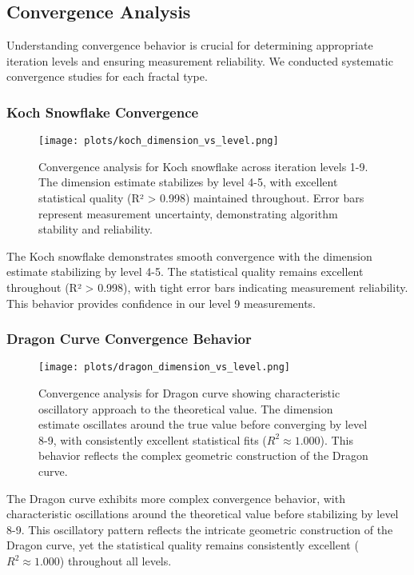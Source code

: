 \documentclass[preprint,12pt]{elsarticle}
\begin{document}
\subsection{Convergence Analysis}

Understanding convergence behavior is crucial for determining appropriate iteration levels and ensuring measurement reliability. We conducted systematic convergence studies for each fractal type.

\subsubsection{Koch Snowflake Convergence}

\begin{figure}[ht]
\centering
\texttt{[image: plots/koch\_dimension\_vs\_level.png]}
\caption{Convergence analysis for Koch snowflake across iteration levels 1-9. The dimension estimate stabilizes by level 4-5, with excellent statistical quality (R² > 0.998) maintained throughout. Error bars represent measurement uncertainty, demonstrating algorithm stability and reliability.}
\label{fig:koch_convergence}
\end{figure}

The Koch snowflake demonstrates smooth convergence with the dimension estimate stabilizing by level 4-5. The statistical quality remains excellent throughout (R² > 0.998), with tight error bars indicating measurement reliability. This behavior provides confidence in our level 9 measurements.

\subsubsection{Dragon Curve Convergence Behavior}

\begin{figure}[ht]
\centering
\texttt{[image: plots/dragon\_dimension\_vs\_level.png]}
\caption{Convergence analysis for Dragon curve showing characteristic oscillatory approach to the theoretical value. The dimension estimate oscillates around the true value before converging by level 8-9, with consistently excellent statistical fits ($R^2 \approx 1.000$). This behavior reflects the complex geometric construction of the Dragon curve.}
\label{fig:dragon_convergence}
\end{figure}

The Dragon curve exhibits more complex convergence behavior, with characteristic oscillations around the theoretical value before stabilizing by level 8-9. This oscillatory pattern reflects the intricate geometric construction of the Dragon curve, yet the statistical quality remains consistently excellent ($R^2 \approx 1.000$) throughout all levels.
\end{document}
